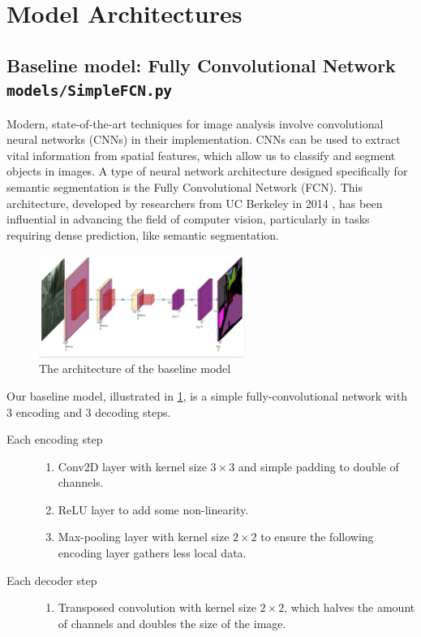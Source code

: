 \section{Model Architectures}
\subsection{Baseline model: Fully Convolutional Network \phantom{xx}\small\texttt{models/SimpleFCN.py}}

Modern, state-of-the-art techniques for image analysis involve convolutional neural networks (CNNs) in their implementation. CNNs can be used to extract vital information from spatial features, which allow us to classify and segment objects in images. A type of neural network architecture designed specifically for semantic segmentation is the Fully Convolutional Network (FCN). This architecture, developed by researchers from UC Berkeley in 2014 \cite{DBLP:journals/corr/LongSD14}, has been influential in advancing the field of computer vision, particularly in tasks requiring dense prediction, like semantic segmentation. 

\begin{figure}
    \centering 
    \includegraphics[width=0.6\textwidth]{SimpleFCN.png}
    \caption{The architecture of the baseline model}
    \label{baseline_model}
\end{figure}

Our baseline model, illustrated in \cref{baseline_model}, is a simple fully-convolutional network with 3 encoding and 3 decoding steps.

\begin{description}
	\item[Each encoding step] \phantom{hello}
		\begin{enumerate}
			\item Conv2D layer with kernel size $3 \times 3$ and simple padding to double of channels.
			\item ReLU layer to add some non-linearity.
			\item Max-pooling layer with kernel size $2 \times 2$ to ensure the following encoding layer gathers less local data.
		\end{enumerate}
	\item[Each decoder step] \phantom{hello}
		\begin{enumerate}
			\item Transposed convolution with kernel size $2 \times 2$, which halves the amount of channels and doubles the size of the image.
		\end{enumerate}
\end{description}

